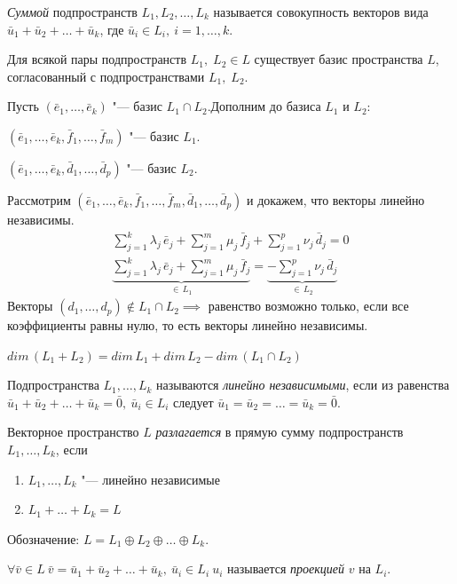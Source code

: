 \begin{definition}
  \textit{Суммой} подпространств $L_1,L_2, \ldots, L_k$ называется совокупность векторов вида $\bar{u}_1 + \bar{u}_2 + \ldots + \bar{u}_k$, где $\bar{u}_i \in L_i,~ i = 1,\ldots,k.$
\end{definition}


\begin{theorem}
  Для всякой пары подпространств $L_1,\; L_2 \in L$ существует базис пространства $L$, согласованный с подпространствами $L_1,\;L_2$.
\end{theorem}
\begin{Proof}
  Пусть $(\bar{e}_1, \ldots, \bar{e}_k)$ "--- базис $L_1 \cap L_2$.Дополним до базиса $L_1$ и $L_2$:

  $(\bar{e}_1, \ldots, \bar{e}_k, \bar{f}_1, \ldots, \bar{f}_m)$ "--- базис $L_1$.

  $(\bar{e}_1,\ldots, \bar{e}_k, \bar{d}_1, \ldots, \bar{d}_p)$ "--- базис $L_2$.

  Рассмотрим $(\bar{e}_1, \ldots, \bar{e}_k, \bar{f}_1, \ldots, \bar{f}_m,\bar{d}_1, \ldots, \bar{d}_p)$ и докажем, что векторы линейно независимы.
  \begin{gather*}
    \sum_{j = 1}^{k}\lambda_j \, \bar{e}_j + \sum_{j = 1}^{m} \mu_j \, \bar{f}_j + \sum_{j = 1}^{p} \nu_j \, \bar{d}_j = 0 \\
    \underbrace{\sum_{j = 1}^{k}\lambda_j \, \bar{e}_j + \sum_{j = 1}^{m} \mu_j \, \bar{f}_j}_{\in \, L_1} = \underbrace{-\sum_{j = 1}^{p} \nu_j \, \bar{d}_j}_{\in \, L_2} 
  \end{gather*}
  Векторы $(d_1, \ldots, d_p) \notin L_1 \cap L_2 \implies$ равенство возможно только, если все коэффициенты равны нулю, то есть векторы линейно независимы.
\end{Proof}

\begin{corollary}
  $dim\,(L_1 + L_2) = dim\,L_1 + dim\,L_2 - dim\,(L_1 \cap L_2)$  
\end{corollary}

\begin{definition}
  Подпространства $L_1, \ldots, L_k$ называются \textit{линейно независимыми}, если из равенства $\bar{u}_1 + \bar{u}_2 + 
  \ldots + \bar{u}_k = \bar{0},~ \bar{u}_i \in L_i$ следует $\bar{u}_1 = \bar{u}_2 = \ldots = \bar{u}_k = \bar{0}$. 
\end{definition}

\begin{definition}
  Векторное пространство $L$ \textit{разлагается} в прямую сумму подпространств $L_1, \ldots, L_k$, если 
  \begin{enumerate}
    \item $L_1, \ldots, L_k$ "--- линейно независимые
    \item $L_1 + \ldots + L_k = L$
  \end{enumerate}
  Обозначение: $L = L_1 \oplus L_2 \oplus \ldots \oplus L_k$.
\end{definition}
$\forall \bar{v} \in L ~ \bar{v} = \bar{u}_1 + \bar{u}_2 + \ldots + \bar{u}_k,~ \bar{u}_i \in L_i ~ u_i$ называется \textit{проекцией} $v$ на $L_i$.

